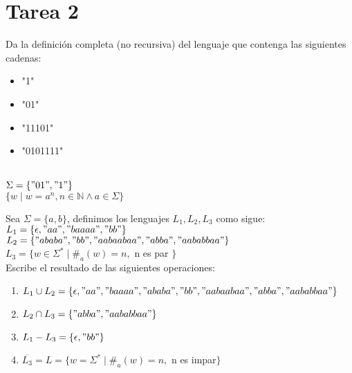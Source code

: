 \renewcommand{\labelenumi}{\alph{enumi})}

\section*{Tarea 2}

\begin{questions}
\question Da la definición completa (no recursiva) del lenguaje que contenga las siguientes cadenas:
\begin{itemize}
    \item "1"
    \item "01"
    \item "11101"
    \item "0101111"
\end{itemize}
\begin{solution}
    \\
    $\Sigma = \{"01", "1"\}$ \\
    $\{w \mid w=a^{n}, n \in \mathbb{N}  \wedge a \in \Sigma \}$
\end{solution} 
\question Sea $\Sigma = \{a,b\}$, definimos los lenguajes $L_{1}, L_{2}, L_{3}$ como sigue: \\
$L_{1} = \{\epsilon, "aa", "baaaa", "bb"\}$ \\
$L_{2} = \{"ababa", "bb", "aabaabaa", "abba", "aababbaa"\}$ \\
$L_{3} = \{w \in \Sigma^{*} \mid \#_a(w) = n,$ n es par $\}$ \\
Escribe el resultado de las siguientes operaciones:
\\
\begin{solution}
    \begin{enumerate}
        \item $L_{1} \cup L_{2} = \{ \epsilon, "aa", "baaaa", "ababa", "bb", "aabaabaa", "abba", "aababbaa"\}$
        \item $L_{2} \cap L_{3} = \{"abba", "aababbaa"\}$
        \item $L_{1} - L_{3} = \{ \epsilon, "bb" \}$
        \item $\overline{L_{3}} = L = \{w = \Sigma^{*} \mid \#_{a}(w) = n,$ n es impar$\}$
    \end{enumerate}
\end{solution} 
\end{questions}
